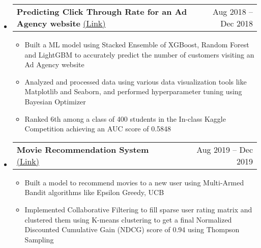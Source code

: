 \documentclass[letterpaper,12pt, margin=2in]{article}
\makeatletter
\newcommand{\resumeItem}[1]{
  \item\small{
    {#1 \vspace{-2pt}}
  }
}
\newcommand{\resumeProjectHeading}[2]{
    \item
    \begin{tabular*}{0.97\textwidth}{l@{\extracolsep{\fill}}r}
      \small#1 & #2 \\
    \end{tabular*}\vspace{-9pt}
}
\newcommand{\resumeSubHeadingListStart}{\begin{itemize}[leftmargin=0.05in, label={}]}
\newcommand{\resumeSubHeadingListEnd}{\end{itemize}}
\newcommand{\resumeItemListStart}{\begin{itemize}}
\newcommand{\resumeItemListEnd}{\end{itemize}\vspace{-8pt}}
\makeatother
\begin{document}
    \resumeSubHeadingListStart
    \resumeProjectHeading
          {\textbf{Predicting Click Through Rate for an Ad Agency website} \href{https://towardsdatascience.com/predicting-click-through-rate-for-a-website-7cd2a892d26e}{(Link)}}{Aug 2018 -- Dec 2018}
          \resumeItemListStart
            \resumeItem{Built a ML model using Stacked Ensemble of XGBoost, Random Forest and LightGBM to accurately predict the number of customers visiting an Ad Agency website}
            \resumeItem{Analyzed and processed data using various data visualization tools like Matplotlib and Seaborn, and performed hyperparameter tuning using Bayesian Optimizer}
            \resumeItem{Ranked 6th among a class of 400 students in the In-class Kaggle Competition achieving an AUC score of 0.5848}
          \resumeItemListEnd
      \resumeProjectHeading
          {\textbf{Movie Recommendation System} \href{https://towardsdatascience.com/solving-cold-user-problem-for-recommendation-system-using-multi-armed-bandit-d36e42fe8d44}{(Link)}}{Aug 2019 -- Dec 2019}
          \resumeItemListStart
            \resumeItem{Built a model to recommend movies to a new user using Multi-Armed Bandit algorithms like Epsilon Greedy, UCB}
            \resumeItem{Implemented Collaborative Filtering to fill sparse user rating matrix and clustered them using K-means clustering to get a final Normalized Discounted Cumulative Gain (NDCG) score of 0.94 using Thompson Sampling}
          \resumeItemListEnd
        \resumeSubHeadingListEnd

\end{document}
